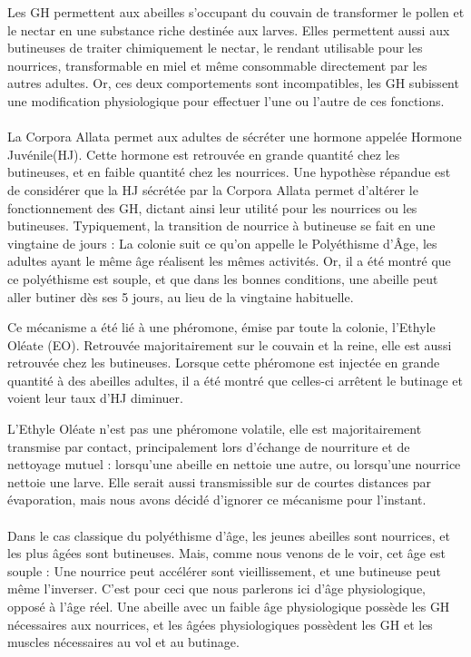 			Les GH permettent aux abeilles s'occupant du couvain de transformer le pollen et le nectar en une substance riche destinée aux larves. Elles permettent aussi aux butineuses de traiter chimiquement le nectar, le rendant utilisable pour les nourrices, transformable en miel et même consommable directement par les autres adultes. Or, ces deux comportements sont incompatibles, les GH subissent une modification physiologique pour effectuer l'une ou l'autre de ces fonctions.
			
			\paragraph{}
			La Corpora Allata permet aux adultes de sécréter une hormone appelée Hormone Juvénile(HJ). Cette hormone est retrouvée en grande quantité chez les butineuses, et en faible quantité chez les nourrices. Une hypothèse répandue est de considérer que la HJ sécrétée par la Corpora Allata permet d'altérer le fonctionnement des GH, dictant ainsi leur utilité pour les nourrices ou les butineuses. Typiquement, la transition de nourrice à butineuse se fait en une vingtaine de jours : La colonie suit ce qu'on appelle le Polyéthisme d'Âge, les adultes ayant le même âge réalisent les mêmes activités. Or, il a été montré que ce polyéthisme est souple, et que dans les bonnes conditions, une abeille peut aller butiner dès ses 5 jours, au lieu de la vingtaine habituelle.
			
			Ce mécanisme a été lié à une phéromone, émise par toute la colonie, l'Ethyle Oléate (EO). Retrouvée majoritairement sur le couvain et la reine, elle est aussi retrouvée chez les butineuses. Lorsque cette phéromone est injectée en grande quantité à des abeilles adultes, il a été montré que celles-ci arrêtent le butinage et voient leur taux d'HJ diminuer.
			
			L'Ethyle Oléate n'est pas une phéromone volatile, elle est majoritairement transmise par contact, principalement lors d'échange de nourriture et de nettoyage mutuel : lorsqu'une abeille en nettoie une autre, ou lorsqu'une nourrice nettoie une larve. Elle serait aussi transmissible sur de courtes distances par évaporation, mais nous avons décidé d'ignorer ce mécanisme pour l'instant.
			
			
			\paragraph{}
			Dans le cas classique du polyéthisme d'âge, les jeunes abeilles sont nourrices, et les plus âgées sont butineuses. Mais, comme nous venons de le voir, cet âge est souple : Une nourrice peut accélérer sont vieillissement, et une butineuse peut même l'inverser. C'est pour ceci que nous parlerons ici d'âge physiologique, opposé à l'âge réel. Une abeille avec un faible âge physiologique possède les GH nécessaires aux nourrices, et les âgées physiologiques possèdent les GH et les muscles nécessaires au vol et au butinage. 
			
